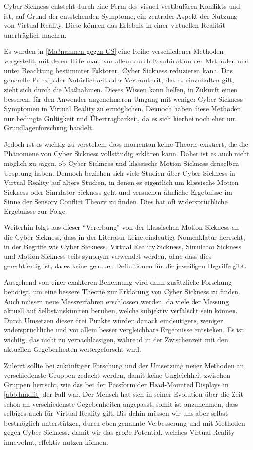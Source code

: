 Cyber Sickness entsteht durch eine Form des visuell-vestibul\"aren Konflikts und ist, auf Grund der entstehenden Symptome, ein zentraler Aspekt der Nutzung von Virtual Reality. Diese k\"onnen das Erlebnis in einer virtuellen Realit\"at unertr\"aglich machen.

Es wurden in \autoref{Maßnahmen gegen CS} eine Reihe verschiedener Methoden vorgestellt, mit deren Hilfe man, vor allem durch Kombination der Methoden und unter Beachtung bestimmter Faktoren, Cyber Sickness reduzieren kann. Das generelle Prinzip der Nat\"urlichkeit oder Vertrautheit, das es einzuhalten gilt, zieht sich durch die Ma{\ss}nahmen.
Dieses Wissen kann helfen, in Zukunft einen besseren, f\"ur den Anwender angenehmeren Umgang mit weniger Cyber Sickness-Symptomen in Virtual Reality zu erm\"oglichen. Dennoch haben diese Methoden nur bedingte G\"ultigkeit und \"Ubertragbarkeit, da es sich hierbei noch eher um Grundlagenforschung handelt.

Jedoch ist es wichtig zu verstehen, dass momentan keine Theorie existiert, die die Ph\"anomene von Cyber Sickness vollst\"andig erkl\"aren kann. Daher ist es auch nicht m\"oglich zu sagen, ob Cyber Sickness und klassische Motion Sickness denselben Ursprung haben. Dennoch beziehen sich viele Studien \"uber Cyber Sickness in Virtual Reality auf \"altere Studien, in denen es eigentlich um klassische Motion Sickness oder Simulator Sickness geht und versuchen \"ahnliche Ergebnisse im Sinne der Sensory Conflict Theory zu finden. Dies hat oft widerspr\"uchliche Ergebnisse zur Folge.

Weiterhin folgt aus dieser "`Vererbung"' von der klassischen Motion Sickness an die Cyber Sickness, dass in der Literatur keine eindeutige Nomenklatur herrscht, in der Begriffe wie Cyber Sickness, Virtual Reality Sickness, Simulator Sickness und Motion Sickness teils synonym verwendet werden, ohne dass dies gerechtfertig ist, da es keine genauen Definitionen f\"ur die jeweiligen Begriffe gibt.

Ausgehend von einer exakteren Benennung wird dann zus\"atzliche Forschung ben\"otigt, um eine bessere Theorie zur Erkl\"arung von Cyber Sickness zu finden. Auch m\"ussen neue Messverfahren erschlossen werden, da viele der Messung aktuell auf Selbstausk\"unften beruhen, welche subjektiv verf\"alscht sein k\"onnen. Durch Umsetzen dieser drei Punkte w\"urden danach eindeutigere, weniger widerspr\"uchliche und vor allem besser vergleichbare Ergebnisse entstehen. Es ist wichtig, das nicht zu vernachl\"assigen, w\"ahrend in der Zwischenzeit mit den aktuellen Gegebenheiten weitergeforscht wird.

Zuletzt sollte bei zuk\"unftiger Forschung und der Umsetzung neuer Methoden an verschiedenste Gruppen gedacht werden, damit keine Ungleichheit zwischen Gruppen herrscht, wie das bei der Passform der Head-Mounted Displays in \autoref{abb:hmdfit} der Fall war. Der Mensch hat sich in seiner Evolution \"uber die Zeit schon an verschiedenste Gegebenheiten angepasst, somit ist anzunehmen, dass selbiges auch f\"ur Virtual Reality gilt. Bis dahin m\"ussen wir uns aber selbst bestm\"oglich unterst\"utzen, durch eben genannte Verbesserung und mit Methoden gegen Cyber Sickness, damit wir das gro{\ss}e Potential, welches Virtual Reality innewohnt, effektiv nutzen k\"onnen.
